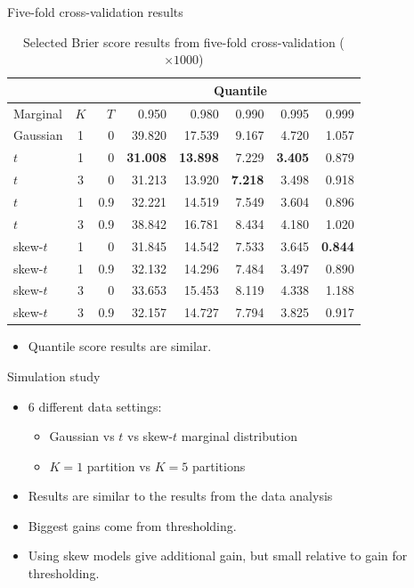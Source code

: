 \documentclass{beamer}
\begin{document}
\begin{frame}{Five-fold cross-validation results}
  \begin{table}[htbp]
    \small
    \centering
    \begin{tabular}{l|c|r|rrrrr}
          \multicolumn{3}{c}{\ } & \multicolumn{5}{c}{Quantile}\\
           \hline
  Marginal & $K$ & $T$  & 0.950 & 0.980 & 0.990 & 0.995 & 0.999\\
  \hline
Gaussian 	& 1 & 0 	& 39.820 & 17.539 & 9.167 & 4.720 & 1.057\\
$t$		& 1 & 0 	& {\bf 31.008} & {\bf 13.898} & 7.229 & {\bf 3.405} & 0.879\\
$t$		& 3 & 0	& 31.213 & 13.920 & {\bf 7.218} & 3.498 & 0.918\\
$t$		& 1 & 0.9	& 32.221 & 14.519 & 7.549 & 3.604 & 0.896\\
$t$		& 3 & 0.9 	& 38.842 & 16.781 & 8.434 & 4.180 & 1.020\\
skew-$t$	& 1 & 0	& 31.845 & 14.542 & 7.533 & 3.645 & {\bf 0.844}\\
skew-$t$	& 1 & 0.9	& 32.132 & 14.296 & 7.484 & 3.497 & 0.890\\
skew-$t$	& 3 & 0	& 33.653 & 15.453 & 8.119 & 4.338 & 1.188\\
skew-$t$	& 3 & 0.9 	& 32.157 & 14.727 & 7.794 & 3.825 & 0.917\\
\hline
    \end{tabular}
    \caption{Selected Brier score results from five-fold cross-validation ($\times 1000$)}
  \end{table}
  \begin{itemize}
  	\item Quantile score results are similar.
  \end{itemize}
\end{frame}

\begin{frame}{Simulation study}
  \begin{itemize} \setlength{\itemsep}{0.5em}
    \item 6 different data settings:
    \begin{itemize}
    	\item Gaussian vs $t$ vs skew-$t$ marginal distribution
        \item $K=1$ partition vs $K=5$ partitions
    \end{itemize}
    \item Results are similar to the results from the data analysis
    \item Biggest gains come from thresholding.
    \item Using skew models give additional gain, but small relative to gain for thresholding.
  \end{itemize}
\end{frame}
\end{document}
